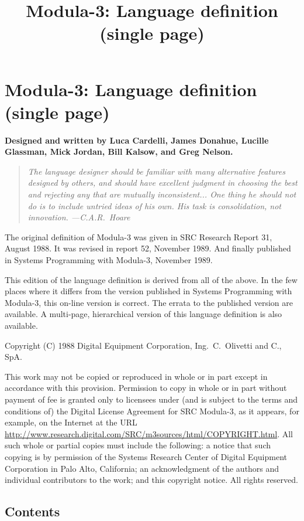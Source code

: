 \documentclass[10pt]{article}
\title{Modula-3: Language definition (single page)}
\begin{document}
\section*{Modula-3: Language definition (single page)}

\textbf{Designed and written by Luca Cardelli, James Donahue, Lucille
  Glassman, Mick Jordan, Bill Kalsow, and Greg Nelson.}

\begin{quote}
  \emph{ The language designer should be familiar with many alternative
    features designed by others, and should have excellent judgment in
    choosing the best and rejecting any that are mutually inconsistent... One
    thing he should not do is to include untried ideas of his own.  His task is
    consolidation, not innovation.  ---C.A.R.\ Hoare }
\end{quote}

The original definition of Modula-3 was given in SRC Research Report 31,
August 1988.  It was revised in report 52, November 1989.  And finally published
in Systems Programming with Modula-3, November 1989.

This edition of the language definition is derived from all of the above.  In
the few places where it differs from the version published in Systems
Programming with Modula-3, this on-line version is correct.  The errata to the
published version are available.  A multi-page, hierarchical version of this
language definition is also available.

Copyright (C) 1988 Digital Equipment Corporation, Ing.\ C.\ Olivetti and C.,
SpA.

This work may not be copied or reproduced in whole or in part except in
accordance with this provision.  Permission to copy in whole or in part without
payment of fee is granted only to licensees under (and is subject to the terms
and conditions of) the Digital License Agreement for SRC Modula-3, as it
appears, for example, on the Internet at the URL
\url{http://www.research.digital.com/SRC/m3sources/html/COPYRIGHT.html}.  All
such whole or partial copies must include the following: a notice that such
copying is by permission of the Systems Research Center of Digital Equipment
Corporation in Palo Alto, California; an acknowledgment of the authors and
individual contributors to the work; and this copyright notice.  All rights
reserved.

\subsection*{Contents}
\end{document}
